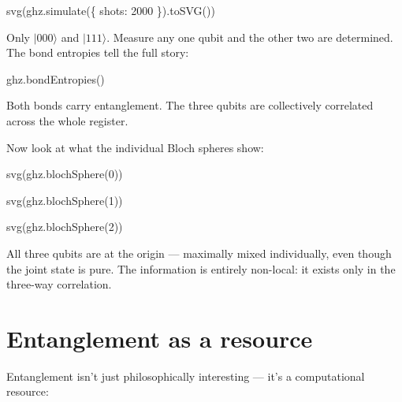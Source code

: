 \documentclass[
  11pt,
  letterpaper,
  oneside]{scrbook}
\newenvironment{Shaded}{\begin{snugshade}}{\end{snugshade}}
\newcommand{\NormalTok}[1]{\textcolor[rgb]{0.00,0.23,0.31}{#1}}
\begin{document}
\begin{Shaded}
\begin{Highlighting}[]
\NormalTok{svg(ghz.simulate(\{ shots: 2000 \}).toSVG())}
\end{Highlighting}
\end{Shaded}

Only \(|000\rangle\) and \(|111\rangle\). Measure any one qubit and the
other two are determined. The bond entropies tell the full story:

\begin{Shaded}
\begin{Highlighting}[]
\NormalTok{ghz.bondEntropies()}
\end{Highlighting}
\end{Shaded}

Both bonds carry entanglement. The three qubits are collectively
correlated across the whole register.

Now look at what the individual Bloch spheres show:

\begin{Shaded}
\begin{Highlighting}[]
\NormalTok{svg(ghz.blochSphere(0))}
\end{Highlighting}
\end{Shaded}

\begin{Shaded}
\begin{Highlighting}[]
\NormalTok{svg(ghz.blochSphere(1))}
\end{Highlighting}
\end{Shaded}

\begin{Shaded}
\begin{Highlighting}[]
\NormalTok{svg(ghz.blochSphere(2))}
\end{Highlighting}
\end{Shaded}

All three qubits are at the origin --- maximally mixed individually,
even though the joint state is pure. The information is entirely
non-local: it exists only in the three-way correlation.

\section{Entanglement as a resource}\label{entanglement-as-a-resource}

Entanglement isn't just philosophically interesting --- it's a
computational resource:
\end{document}
